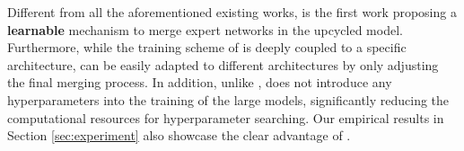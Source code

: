 Different from all the aforementioned existing works, \ours is the first work proposing a \textbf{learnable} mechanism to merge expert networks in the upcycled \moe model. Furthermore, while the training scheme of \ewa is deeply coupled to a specific \moe architecture, \ours can be easily adapted to different \moe architectures by only adjusting the final merging process. 
In addition, unlike \ewa, \ours does not introduce any hyperparameters into the training of the large \moe models, 
significantly reducing the computational resources for hyperparameter searching. 
Our empirical results in Section \ref{sec:experiment} also showcase the clear advantage of \ours.
